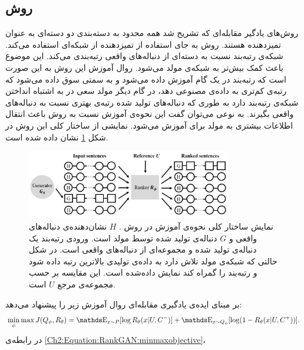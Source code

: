  \subsection{ روش }\label{Method:RankGAN}
روش‌های یادگیر مقابله‌ای که تشریح شد همه محدود به دسته‌بندی دو دسته‌ای به عنوان تمیزدهنده هستند. روش
\cite{lin2017adversarial}
به جای استفاده از تمیزدهنده از شبکه‌ای 
استفاده می‌کند. شبکه‌ی رتبه‌بند نسبت به دسته‌ای از دنباله‌های واقعی رتبه‌بندی می‌کند. این موضوع باعث کمک بیش‌تر به شبکه‌ی مولد می‌شود.
روال آموزش این روش به این صورت است که رتبه‌بند در یک گام آموزش داده می‌شود و به سمتی سوق داده می‌شود که رتبه‌ی کم‌تری به داده‌ی مصنوعی دهد، در گام دیگر مولد سعی در به اشتباه انداختن شبکه‌ی رتبه‌بند دارد به طوری که دنباله‌های تولید شده رتبه‌ی بهتری نسبت به دنباله‌های واقعی بگیرند. به نوعی می‌توان گفت این نحوه‌ی آموزش نسبت به روش
باعث انتقال اطلاعات بیشتری به مولد برای آموزش می‌شود.
نمایشی از ساختار کلی این روش در شکل
\ref{Figure:RankGAN:Architecture}
نشان داده شده است.
\begin{figure}[!htb]
	\centering
	\includegraphics[width=0.8\textwidth]{images/ArchitectureRankGAN.png}
		\caption[نمایش ساختار کلی نحوه‌ی آموزش در روش 
		]{
			نمایش ساختار کلی نحوه‌ی آموزش در روش 
			\cite{lin2017adversarial}.
			$H$
			نشان‌دهنده‌ی دنباله‌های واقعی  و
			$G$
			دنباله‌ی تولید شده توسط مولد است.
			ورودی رتبه‌بند یک دنباله‌ی تولید شده و مجموعه‌ای از دنباله‌های واقعی است. در شکل حالتی که شبکه‌ی مولد تلاش دارد به داده‌ی تولیدی بالاترین رتبه داده شود و رتبه‌بند را گمراه کند نمایش داده‌شده است. این مقایسه بر حسب مجموعه‌ی مرجع $U$ است.
			}
	\label{Figure:RankGAN:Architecture}
\end{figure}
\newline
{}
بر مبنای ایده‌ی یادگیری مقابله‌ای روال آموزش زیر را پیشنهاد می‌دهد:
\begin{equation}\label{Ch2:Equation:RankGAN:minmaxobjective}
\min_{\phi} \max_{} J(Q_\phi, R_\theta) = \ME_{x \sim P} [\log R_\theta (x | U , C^-)] + \ME_{x \sim Q_\phi} [\log (1- R_\theta (x|U,C^+))].
\end{equation}
در رابطه‌ی
\ref{Ch2:Equation:RankGAN:minmaxobjective}،
